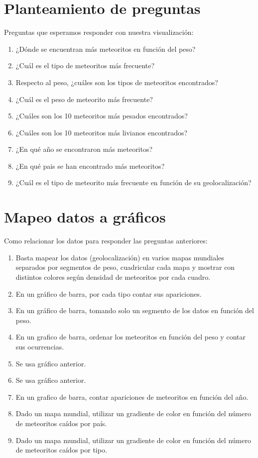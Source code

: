 \documentclass[letterpaper,10pt]{article}
\begin{document}
	\section{Planteamiento de preguntas}

	Preguntas que esperamos responder con nuestra visualización:


	\begin{enumerate}
		\item ¿Dónde se encuentran más meteoritos en función del peso?
		\item ¿Cuál es el tipo de meteoritos más frecuente? %
		\item Respecto al peso, ¿cuáles son los tipos de meteoritos encontrados? %

		\item ¿Cuál es el peso de meteorito más frecuente?
		\item ¿Cuáles son los 10 meteoritos más pesados encontrados?
		\item ¿Cuáles son los 10 meteoritos más livianos encontrados?

		\item ¿En qué año se encontraron más meteoritos?
		\item ¿En qué pais se han encontrado más meteoritos?
		\item ¿Cuál es el tipo de meteorito más frecuente en función de su geolocalización?
	\end{enumerate}

	\section{Mapeo datos a gráficos}

	Como relacionar los datos para responder las preguntas anteriores:

	\begin{enumerate}
		\item Basta mapear los datos (geolocalización) en varios mapas mundiales separados por segmentos de peso, cuadricular cada mapa y mostrar con distintos colores según densidad
		de meteoritos por cada cuadro.
		\item En un gráfico de barra, por cada tipo contar sus apariciones.
		\item En un gráfico de barra, tomando solo un segmento de los datos en función del peso.

		\item En un grafico de barra, ordenar los meteoritos en función del peso y contar sus ocurrencias.
		\item Se usa gráfico anterior.
		\item Se usa gráfico anterior.

		\item En un grafico de barra, contar apariciones de meteoritos en función del año.
		\item Dado un mapa mundial, utilizar un gradiente de color en función del número de meteoritos caídos por país.
		\item Dado un mapa mundial, utilizar un gradiente de color en función del número de meteoritos caídos por tipo.
	\end{enumerate}
\end{document}
